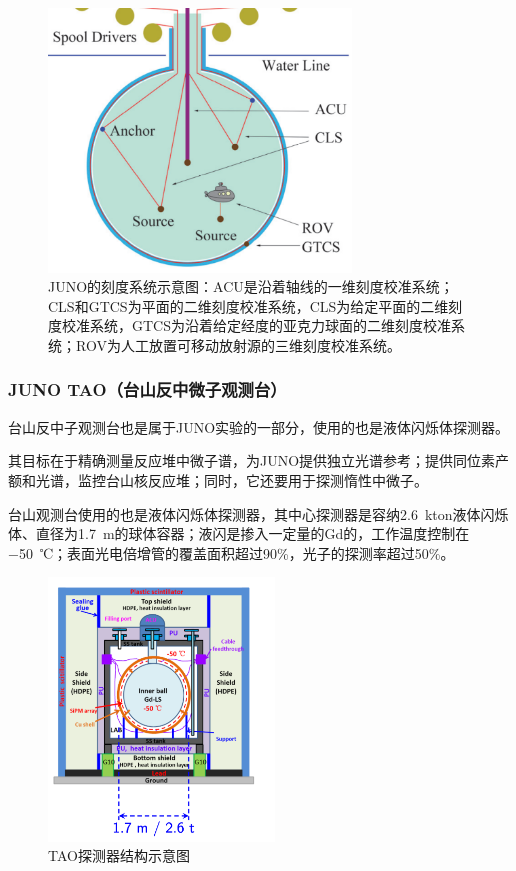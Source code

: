 \documentclass[10pt,a4paper]{article}
\begin{document}
\begin{figure}[H]
 \centering
 \includegraphics[height=7cm]{images/刻度系统.png}
 \caption{JUNO的刻度系统示意图：ACU是沿着轴线的一维刻度校准系统；CLS和GTCS为平面的二维刻度校准系统，CLS为给定平面的二维刻度校准系统，GTCS为沿着给定经度的亚克力球面的二维刻度校准系统；ROV为人工放置可移动放射源的三维刻度校准系统。}
 \label{fig:41}
\end{figure}

\subsubsection{JUNO TAO（台山反中微子观测台）}\label{sub:6}

台山反中子观测台也是属于JUNO实验的一部分，使用的也是液体闪烁体探测器。

其目标在于精确测量反应堆中微子谱，为JUNO提供独立光谱参考；提供同位素产额和光谱，监控台山核反应堆；同时，它还要用于探测惰性中微子。

台山观测台使用的也是液体闪烁体探测器，其中心探测器是容纳\SI{2.6}{kton}液体闪烁体、直径为\SI{1.7}{m}的球体容器；液闪是掺入一定量的Gd的，工作温度控制在\SI{-50}{℃}；表面光电倍增管的覆盖面积超过90\%，光子的探测率超过50\%。\cite{Abusleme:2020bzt}

\begin{figure}[H]
 \centering
 \includegraphics[height=7cm]{images/TAO探测器示意图.png}
 \caption{TAO探测器结构示意图}
 \label{fig:40}
\end{figure}
\end{document}
